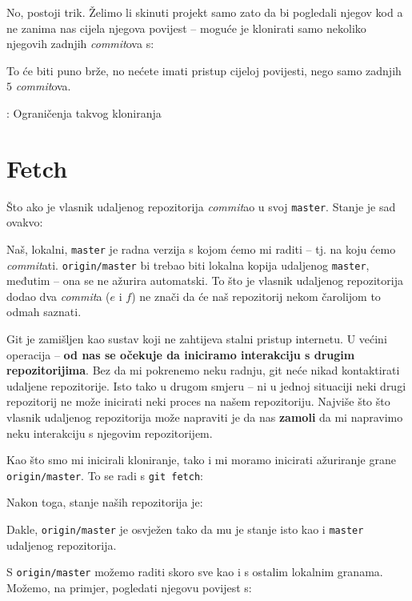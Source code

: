 No, postoji trik.
Želimo li skinuti projekt samo zato da bi pogledali njegov kod a ne zanima nas cijela njegova povijest -- moguće je klonirati samo nekoliko njegovih zadnjih \emph{commit}ova s:


To će biti puno brže, no nećete imati pristup cijeloj povijesti, nego samo zadnjih $5$ \emph{commit}ova.

\TODO: Ograničenja takvog kloniranja


\section*{Fetch}

Što ako je vlasnik udaljenog repozitorija \emph{commit}ao u svoj \verb+master+.
Stanje je sad ovakvo:



Naš, lokalni, \verb+master+ je radna verzija s kojom ćemo mi raditi -- tj. na koju ćemo \emph{commit}ati.
\verb+origin/master+ bi trebao biti lokalna kopija udaljenog \verb+master+, međutim -- ona se ne ažurira automatski.
To što je vlasnik udaljenog repozitorija dodao dva \emph{commit}a ($e$ i $f$) ne znači da će naš repozitorij nekom čarolijom to odmah saznati.

Git je zamišljen kao sustav koji ne zahtijeva stalni pristup internetu.
U većini operacija -- \textbf{od nas se očekuje da iniciramo interakciju s drugim repozitorijima}.
Bez da mi pokrenemo neku radnju, git neće nikad kontaktirati udaljene repozitorije.
Isto tako u drugom smjeru -- ni u jednoj situaciji neki drugi repozitorij ne može inicirati neki proces na našem repozitoriju.
Najviše što što vlasnik udaljenog repozitorija može napraviti je da nas \textbf{zamoli} da mi napravimo neku interakciju s njegovim repozitorijem.

Kao što smo mi inicirali kloniranje, tako i mi moramo inicirati ažuriranje grane \verb+origin/master+.
To se radi s \verb+git fetch+:



Nakon toga, stanje naših repozitorija je:



Dakle, \verb+origin/master+ je osvježen tako da mu je stanje isto kao i \verb+master+ udaljenog repozitorija.

S \verb+origin/master+ možemo raditi skoro sve kao i s ostalim lokalnim granama.
Možemo, na primjer, pogledati njegovu povijest s:

